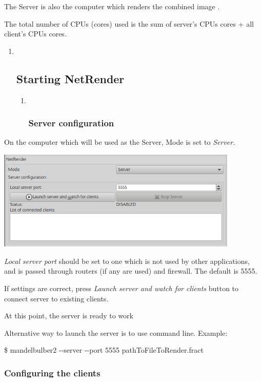 The Server is also the computer which renders the combined image .

The total number of CPUs (cores) used is the sum of server's CPUs cores
+ all client's CPUs cores.

\begin{enumerate}
\def\labelenumi{\arabic{enumi}.}
\item ~
  \subsection{Starting NetRender}\label{starting-netrender}

  \begin{enumerate}
  \def\labelenumii{\alph{enumii}.}
  \item ~
    \subsubsection{Server configuration}\label{server-configuration}
  \end{enumerate}
\end{enumerate}

On the computer which will be used as the Server, Mode is set to
\emph{Server.}

\includegraphics[width=4.53071in,height=1.86614in]{img/manual/media/image28.png}

\emph{Local server port} should be set to one which is not used by other
applications, and is passed through routers (if any are used) and
firewall. The default is 5555.

If settings are correct, press \emph{Launch server and watch for
clients} button to connect server to existing clients.

At this point, the server is ready to work

Alternative way to launch the server is to use command line. Example:

\$ mandelbulber2 -\/-server -\/-port 5555 pathToFileToRender.fract

\subsubsection{Configuring the clients}\label{configuring-the-clients}

